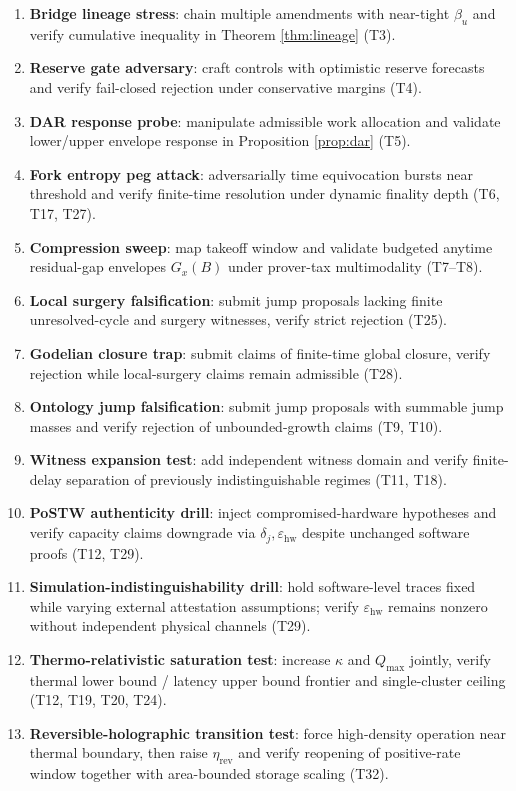 \documentclass[11pt,a4paper]{article}
\newcommand{\eps}{\varepsilon}
\theoremstyle{definition}
\theoremstyle{remark}
\begin{document}
\begin{enumerate}
  \item \textbf{Bridge lineage stress}: chain multiple amendments with near-tight $\beta_u$ and verify cumulative inequality in Theorem \ref{thm:lineage} (T3).
  \item \textbf{Reserve gate adversary}: craft controls with optimistic reserve forecasts and verify fail-closed rejection under conservative margins (T4).
  \item \textbf{DAR response probe}: manipulate admissible work allocation and validate lower/upper envelope response in Proposition \ref{prop:dar} (T5).
  \item \textbf{Fork entropy peg attack}: adversarially time equivocation bursts near threshold and verify finite-time resolution under dynamic finality depth (T6, T17, T27).
  \item \textbf{Compression sweep}: map takeoff window and validate budgeted anytime residual-gap envelopes $G_x(B)$ under prover-tax multimodality (T7--T8).
  \item \textbf{Local surgery falsification}: submit jump proposals lacking finite unresolved-cycle and surgery witnesses, verify strict rejection (T25).
  \item \textbf{Godelian closure trap}: submit claims of finite-time global closure, verify rejection while local-surgery claims remain admissible (T28).
  \item \textbf{Ontology jump falsification}: submit jump proposals with summable jump masses and verify rejection of unbounded-growth claims (T9, T10).
  \item \textbf{Witness expansion test}: add independent witness domain and verify finite-delay separation of previously indistinguishable regimes (T11, T18).
  \item \textbf{PoSTW authenticity drill}: inject compromised-hardware hypotheses and verify capacity claims downgrade via $\delta_j,\eps_{\mathrm{hw}}$ despite unchanged software proofs (T12, T29).
  \item \textbf{Simulation-indistinguishability drill}: hold software-level traces fixed while varying external attestation assumptions; verify $\eps_{\mathrm{hw}}$ remains nonzero without independent physical channels (T29).
  \item \textbf{Thermo-relativistic saturation test}: increase $\kappa$ and $Q_{\max}$ jointly, verify thermal lower bound / latency upper bound frontier and single-cluster ceiling (T12, T19, T20, T24).
  \item \textbf{Reversible-holographic transition test}: force high-density operation near thermal boundary, then raise $\eta_{\mathrm{rev}}$ and verify reopening of positive-rate window together with area-bounded storage scaling (T32).

\end{enumerate}
\end{document}
